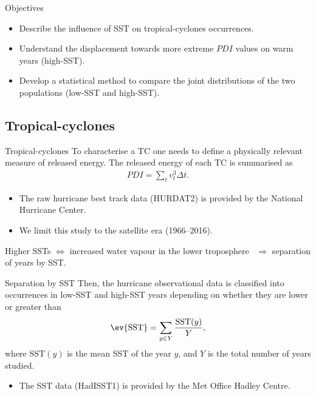 \begin{frame}[label=intro-objectives]{Objectives}
	\begin{itemize}
		\item Describe the influence of SST on tropical-cyclones occurrences.
		\item Understand the displacement towards more extreme $PDI$ values on warm years (high-SST).
		\item Develop a statistical method to compare the joint distributions of the two populations (low-SST and high-SST).
	\end{itemize}


\end{frame}

\subsection{Tropical-cyclones}
\begin{frame}[label=intro-tc]{Tropical-cyclones}
	To characterise a TC one needs to define a physically relevant measure of released energy. The released energy of each TC is summarised as
	\begin{align}\label{eq:pdi}
		PDI = \sum_{t} v_{t}^{3} \Delta t .
	\end{align}
	\begin{itemize}
		\item The raw hurricane best track data (HURDAT2) is provided by the National Hurricane Center.
		\item We limit this study to the satellite era (1966--2016).
	\end{itemize}

	\medskip
	Higher SSTs $\Leftrightarrow$ increased water vapour in the lower troposphere~\cite{Trenberth2005} $\Rightarrow$ separation of years by SST.

\end{frame}

\begin{frame}[label=intro-tc]{Separation by SST}
	Then, the hurricane observational data is classified into occurrences in low-SST and high-SST years depending on whether they are lower or greater than
	\begin{align}
		\ev{\text{SST}} = \sum_{y \in Y} \frac{\text{SST}(y)}{Y} ,
	\end{align}
	where $\text{SST}(y)$ is the mean SST of the year $y$, and $Y$ is the total number of years studied.
	\begin{itemize}
		\item The SST data (HadISST1) is provided by the Met Office Hadley Centre.
	\end{itemize}
\end{frame}

